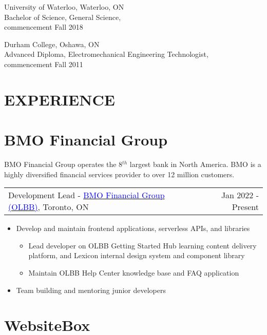 \documentclass[margin]{res}
\begin{document}
\begin{resume}
	University of Waterloo, Waterloo, ON \\
	Bachelor of Science, General Science, \\
	commencement Fall 2018

	Durham College, Oshawa, ON \\
	Advanced Diploma, Electromechanical Engineering Technologist, \\
	commencement Fall 2011


	\section{\textcolor{NavyBlue}{EXPERIENCE}}

	\normalsize{\section{BMO Financial Group}}

	BMO Financial Group operates the 8\begin{math}^{th}\end{math} largest bank in North America. 
	BMO is a highly diversified financial services provider to over 12 million customers.

	\begin{tabular}{p{3in} r} %
		Development Lead - \href{https://bmo.com}{\textcolor{blue}{BMO Financial Group (OLBB)}}, Toronto, ON & Jan 2022 - Present
	\end{tabular}

	\begin{itemize} %
		\item Develop and maintain frontend applications, serverless APIs, and libraries
		\begin{itemize} 
			\item Lead developer on OLBB Getting Started Hub learning content delivery platform, and Lexicon internal design system and component library
			\item Maintain OLBB Help Center knowledge base and FAQ application 
		 \end{itemize}
		\item Team building and mentoring junior developers
	\end{itemize}

	\normalsize{\section{WebsiteBox}}


\end{resume}
\end{document}
